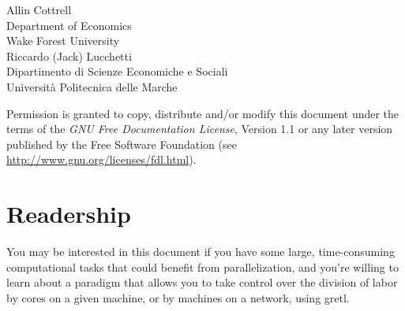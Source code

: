 \documentclass{article}
\begin{document}
\VerbatimFootnotes

\setlength{\parindent}{0pt}
\setlength{\parskip}{1ex}
\setcounter{tocdepth}{1}


\thispagestyle{empty}

\begin{center}


{\large \sffamily
Allin Cottrell\\
Department of Economics\\
Wake Forest University\\

\vspace{20pt}
Riccardo (Jack) Lucchetti\\
Dipartimento di Scienze Economiche e Sociali\\
Universit\`a Politecnica delle Marche\\

\vspace{20pt}

}

\end{center}
\clearpage


\thispagestyle{empty}


\vspace*{2in}

Permission is granted to copy, distribute and/or modify this document
under the terms of the \emph{GNU Free Documentation License}, Version
1.1 or any later version published by the Free Software Foundation
(see \url{http://www.gnu.org/licenses/fdl.html}).

\clearpage


\pagestyle{headings}

\tableofcontents

\clearpage
{}

\section{Readership}
\label{sec:intro}

You may be interested in this document if you have some large,
time-consuming computational tasks that could benefit from
parallelization, and you're willing to learn about a paradigm that
allows you to take control over the division of labor by cores on a
given machine, or by machines on a network, using gretl.
\end{document}
